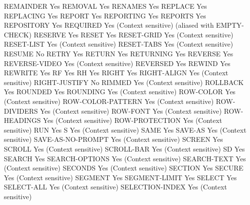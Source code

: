 REMAINDER                       Yes
REMOVAL                         Yes
RENAMES                         Yes
REPLACE                         Yes
REPLACING                       Yes
REPORT                          Yes
REPORTING                       Yes
REPORTS                         Yes
REPOSITORY                      Yes
REQUIRED                        Yes (Context sensitive) (aliased with EMPTY-CHECK)
RESERVE                         Yes
RESET                           Yes
RESET-GRID                      Yes (Context sensitive)
RESET-LIST                      Yes (Context sensitive)
RESET-TABS                      Yes (Context sensitive)
RESUME                          No
RETRY                           Yes
RETURN                          Yes
RETURNING                       Yes
REVERSE                         Yes
REVERSE-VIDEO                   Yes (Context sensitive)
REVERSED                        Yes
REWIND                          Yes
REWRITE                         Yes
RF                              Yes
RH                              Yes
RIGHT                           Yes
RIGHT-ALIGN                     Yes (Context sensitive)
RIGHT-JUSTIFY                   No
RIMMED                          Yes (Context sensitive)
ROLLBACK                        Yes
ROUNDED                         Yes
ROUNDING                        Yes (Context sensitive)
ROW-COLOR                       Yes (Context sensitive)
ROW-COLOR-PATTERN               Yes (Context sensitive)
ROW-DIVIDERS                    Yes (Context sensitive)
ROW-FONT                        Yes (Context sensitive)
ROW-HEADINGS                    Yes (Context sensitive)
ROW-PROTECTION                  Yes (Context sensitive)
RUN                             Yes
S                               Yes (Context sensitive)
SAME                            Yes
SAVE-AS                         Yes (Context sensitive)
SAVE-AS-NO-PROMPT               Yes (Context sensitive)
SCREEN                          Yes
SCROLL                          Yes (Context sensitive)
SCROLL-BAR                      Yes (Context sensitive)
SD                              Yes
SEARCH                          Yes
SEARCH-OPTIONS                  Yes (Context sensitive)
SEARCH-TEXT                     Yes (Context sensitive)
SECONDS                         Yes (Context sensitive)
SECTION                         Yes
SECURE                          Yes (Context sensitive)
SEGMENT                         Yes
SEGMENT-LIMIT                   Yes
SELECT                          Yes
SELECT-ALL                      Yes (Context sensitive)
SELECTION-INDEX                 Yes (Context sensitive)
